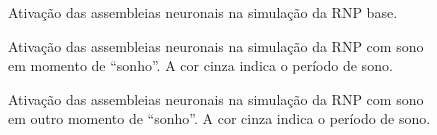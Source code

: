 \begin{figure}[!ht]
\caption{Ativação das assembleias neuronais na simulação da RNP base.}
\end{figure}

\begin{figure}[!ht]
\caption{Ativação das assembleias neuronais na simulação da RNP com sono em momento de ``sonho''. A cor cinza indica o período de sono.}
\end{figure}

\begin{figure}[!ht]
\caption{Ativação das assembleias neuronais na simulação da RNP com sono em outro momento de ``sonho''. A cor cinza indica o período de sono.}
\end{figure}
